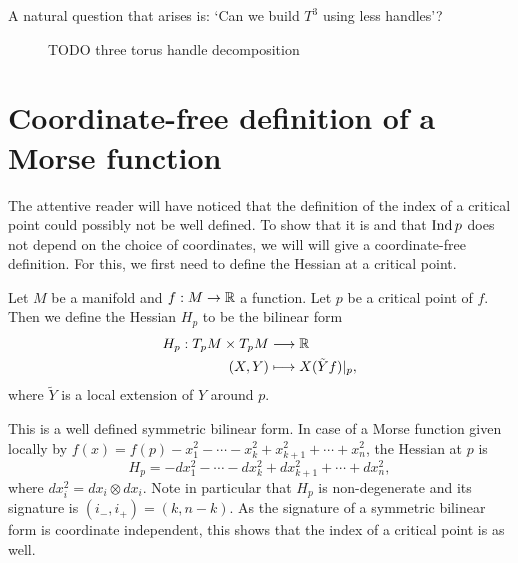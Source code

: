 \begin{eg}[$T^{3} = S^{1} \times S^{1} \times S^{2}$]
    A natural question that arises is: `Can we build $T^{3}$ using less handles'?


    \begin{figure}[H]
    \centering
    \caption{TODO three torus handle decomposition}
    \label{fig:three-torus-handle-decomposition}
\end{figure}
\end{eg}




\section{Coordinate-free definition of a Morse function}


The attentive reader will have noticed that the definition of the index of a critical point could possibly not be well defined.
To show that it is and that $\operatorname{Ind} p$ does not depend on the choice of coordinates, we will will give a coordinate-free definition. For this, we first need to define the Hessian at a critical point.

\begin{definition}
    Let $M$ be a manifold and $f: M \to  \mathbb{R}$ a function.
    Let $p$ be a critical point of $f$.
    Then we define the Hessian $H_p$ to be the bilinear form
    \begin{align*}
        H_p: T_pM \times T_pM &\longrightarrow  \mathbb{R}\\
        (X, Y) &\longmapsto X (\tilde{Y} f)|_p
    ,\end{align*} 
    where $\tilde{Y}$ is a local extension of $Y$ around $p$.
\end{definition}
This is a well defined symmetric bilinear form.
In case of a Morse function given locally by $f(x) = f(p) - x_1^2 - \cdots - x_k^2 + x_{k+1}^2 + \cdots + x_n^2$, the Hessian at $p$ is 
\[
    H_p = - dx_1^2 - \cdots - dx_k^2 + dx_{k+1}^2  + \cdots + dx_n^2
,\] 
where $dx_i^2 = dx_i \otimes dx_i$.
Note in particular that $H_p$ is non-degenerate and its signature is $(i_-, i_{+}) = (k, n-k)$.
As the signature of a symmetric bilinear form is coordinate independent, this shows that the index of a critical point is as well.


